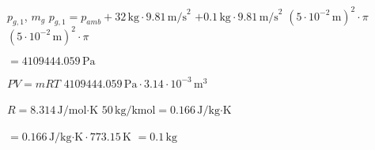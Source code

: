 \( p_{g,1} \), \( m_g \)  
\( p_{g,1} = p_{amb} + 32 \, \text{kg} \cdot 9.81 \, \text{m/s}^2 \)  
\(+ 0.1 \, \text{kg} \cdot 9.81 \, \text{m/s}^2 \)  
\((5 \cdot 10^{-2} \, \text{m})^2 \cdot \pi \)  
\((5 \cdot 10^{-2} \, \text{m})^2 \cdot \pi \)  

\( = 4109444.059 \, \text{Pa} \)  

\( PV = mRT \)  
\( 4109444.059 \, \text{Pa} \cdot 3.14 \cdot 10^{-3} \, \text{m}^3 \)  

\( R = 8.314 \, \text{J/mol·K} \)  
\( 50 \, \text{kg/kmol} = 0.166 \, \text{J/kg·K} \)  

\( = 0.166 \, \text{J/kg·K} \cdot 773.15 \, \text{K} \)  
\( = 0.1 \, \text{kg} \)
